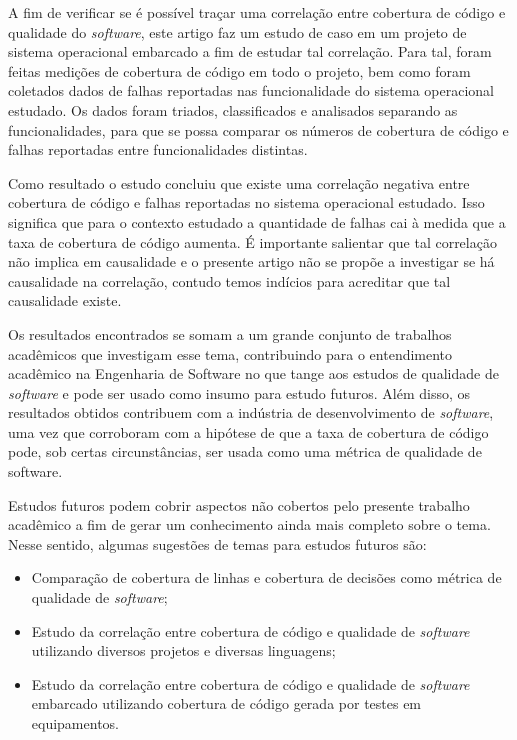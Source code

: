 \documentclass[11.5pt]{article}
\begin{document}
A fim de verificar se é possível traçar uma correlação entre cobertura de código e qualidade do
\textit{software}, este artigo faz um estudo de caso em um projeto de sistema operacional embarcado
a fim de estudar tal correlação.
Para tal, foram feitas medições de cobertura de código em todo o projeto, bem como foram coletados
dados de falhas reportadas nas funcionalidade do sistema operacional estudado.
Os dados foram triados, classificados e analisados separando as funcionalidades, para que se possa
comparar os números de cobertura de código e falhas reportadas entre funcionalidades distintas.

Como resultado o estudo concluiu que existe uma correlação negativa entre cobertura de código e
falhas reportadas no sistema operacional estudado.
Isso significa que para o contexto estudado a quantidade de falhas cai à medida que a taxa de
cobertura de código aumenta.
É importante salientar que tal correlação não implica em causalidade e o presente artigo não se
propõe a investigar se há causalidade na correlação, contudo temos indícios para acreditar que tal
causalidade existe.

Os resultados encontrados se somam a um grande conjunto de trabalhos acadêmicos que investigam esse
tema, contribuindo para o entendimento acadêmico na Engenharia de Software no que tange aos estudos
de qualidade de \textit{software} e pode ser usado como insumo para estudo futuros.
Além disso, os resultados obtidos contribuem com a indústria de desenvolvimento de
\textit{software}, uma vez que corroboram com a hipótese de que a taxa de cobertura de código pode,
sob certas circunstâncias, ser usada como uma métrica de qualidade de software.

Estudos futuros podem cobrir aspectos não cobertos pelo presente trabalho acadêmico a fim de gerar
um conhecimento ainda mais completo sobre o tema.
Nesse sentido, algumas sugestões de temas para estudos futuros são:
\begin{itemize}
    \item Comparação de cobertura de linhas e cobertura de decisões como métrica de qualidade de
          \textit{software};

    \item Estudo da correlação entre cobertura de código e qualidade de \textit{software}
          utilizando diversos projetos e diversas linguagens;

    \item Estudo da correlação entre cobertura de código e qualidade de \textit{software}
          embarcado utilizando cobertura de código gerada por testes em equipamentos.
\end{itemize}
\end{document}
